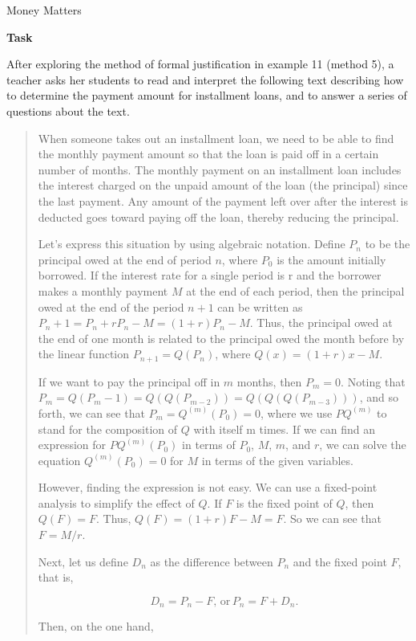 \documentclass[
  10pt,
  a4paper,
  landscape,
  twoside,
  openany
]{scrbook}
\newcounter{example}
\begin{document}
\TriExample
{Money Matters}
{
\noindent
\textbf{Task}

After exploring the method of formal justification in example 11 (method 5), a teacher asks her students to read and interpret the following text describing how to determine the payment amount for installment loans, and to answer a series of questions about the text.

\begin{quotation}
  When someone takes out an installment loan, we need to be able to find the monthly payment amount so that the loan is paid off in a certain number of months. The monthly payment on an installment loan includes the interest charged on the unpaid amount of the loan (the principal) since the last payment. Any amount of the payment left over after the interest is deducted goes toward paying off the loan, thereby reducing the principal.

  Let's express this situation by using algebraic notation. Define $P_n$ to be the principal owed at the end of period $n$, where $P_0$ is the amount initially borrowed. If the interest rate for a single period is r and the borrower makes a monthly payment $M$ at the end of each period, then the principal owed at the end of the period $n + 1$ can be written as $P_n+1=P_n+rP_n-M=(1+r)P_n-M$. Thus, the principal owed at the end of one month is related to the principal owed the month before by the linear function $P_{n+1}=Q(P_n)$, where $Q(x)=(1+r)x-M$.

  If we want to pay the principal off in $m$ months, then $P_m = 0$. Noting that $P_m=Q(P_m-1) =Q(Q(P_{m-2})) = Q(Q(Q(P_{m-3})))$, and so forth, we can see that $P_m = Q^{(m)}(P_0) = 0$, where we use $PQ^{(m)}$ to stand for the composition of $Q$ with itself m times. If we can find an expression for $PQ^{(m)}(P_0)$ in terms of $P_0$, $M$, $m$, and $r$, we can solve the equation $Q^{(m)}(P_0) = 0$ for $M$ in terms of the given variables.

  However, finding the expression is not easy. We can use a fixed-point analysis to simplify the effect of $Q$. If $F$ is the fixed point of $Q$, then $Q(F) = F$. Thus, $Q(F)=(1+r)F-M = F$. So we can see that $F = M/r$.

  Next, let us define $D_n$ as the difference between $P_n$ and the fixed point $F$, that is,

  $$
    D_n=P_n-F, \, \text{or} \, P_n=F+D_n.
  $$

  Then, on the one hand,


\end{quotation}}
\end{document}
